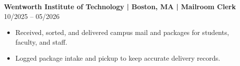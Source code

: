 \noindent
\textbf{Wentworth Institute of Technology | Boston, MA | Mailroom Clerk} \hfill 10/2025 -- 05/2026
\begin{itemize}
    \item Received, sorted, and delivered campus mail and packages for students, faculty, and staff.
    \item Logged package intake and pickup to keep accurate delivery records.
\end{itemize}
